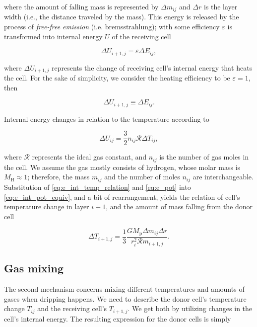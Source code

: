     where the amount of falling mass is represented by $\Delta m_{ij}$ and $\Delta r$ is the layer width (i.e., the distance traveled by the mass). This energy is released by the process of \emph{free-free emission} (i.e. bremsstrahlung); with some efficiency $\varepsilon$ is transformed into internal energy $U$ of the receiving cell

    \begin{equation}
        \Delta U_{i+1,j} = \varepsilon \Delta E_{ij},
    \end{equation}

    where $\Delta U_{i+1,j}$ represents the change of receiving cell's internal energy that heats the cell. For the sake of simplicity, we consider the heating efficiency to be ${\varepsilon=1}$, then  

    \begin{equation}
        \Delta U_{i+1,j} \equiv \Delta E_{ij}.
        \label{eq:e_int_pot_equiv}
    \end{equation} 

    Internal energy changes in relation to the temperature according to 

    \begin{equation}
        \Delta U_{ij} = \frac{3}{2} n_{ij} \mathcal{R} \Delta T_{ij},
        \label{eq:e_int_temp_relation}
    \end{equation}

    where $\mathcal{R}$ represents the ideal gas constant, and $n_{ij}$ is the number of gas moles in the cell. We assume the gas mostly consists of hydrogen, whose molar mass is $M_{\mathrm{H}} \approx 1$; therefore, the mass $m_{ij}$ and the number of moles $n_{ij}$ are interchangeable. Substitution of \eqref{eq:e_int_temp_relation} and \eqref{eq:e_pot} into \eqref{eq:e_int_pot_equiv}, and a bit of rearrangement, yields the relation of cell's temperature change in layer $i+1$, and the amount of mass falling from the donor cell

    \begin{equation}
        \Delta T_{i+1,j} = \frac{1}{3} \frac{G M_{\mathrm{p}} \Delta m_{ij} \Delta r}{r_{i}^2 \mathcal{R} m_{i+1,j}}.
        \label{eq:temp_ff_final}
    \end{equation}

\subsection{Gas mixing}
    The second mechanism concerns mixing different temperatures and amounts of gases when dripping happens. We need to describe the donor cell's temperature change $T_{ij}$ and the receiving cell's $T_{i+1,j}$. We get both by utilizing changes in the cell's internal energy. The resulting expression for the donor cells is simply  

